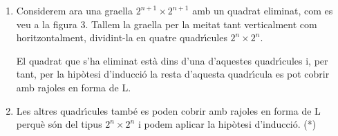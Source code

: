 \begin{enumerate}
\begin{enumerate}
\item Considerem ara una graella $2^{n+1}\times2^{n+1}$ amb un quadrat
eliminat, com es veu a la figura 3. Tallem la graella per la meitat tant
verticalment com horitzontalment, dividint-la en quatre quadr\'{\i}cules
$2^{n}\times2^{n}$.

El quadrat que s'ha eliminat est\`{a} dins d'una d'aquestes quadr\'{\i}cules
i, per tant, per la hip\`{o}tesi d'inducci\'{o} la resta d'aquesta
quadr\'{\i}cula es pot cobrir amb rajoles en forma de L.

\item Les altres quadr\'{\i}cules tamb\'{e} es poden cobrir amb rajoles en
forma de L perqu\`{e} s\'{o}n del tipus $2^{n}\times2^{n}$ i podem aplicar la
hip\`{o}tesi d'inducci\'{o}. (*)
\end{enumerate}
\end{enumerate}
